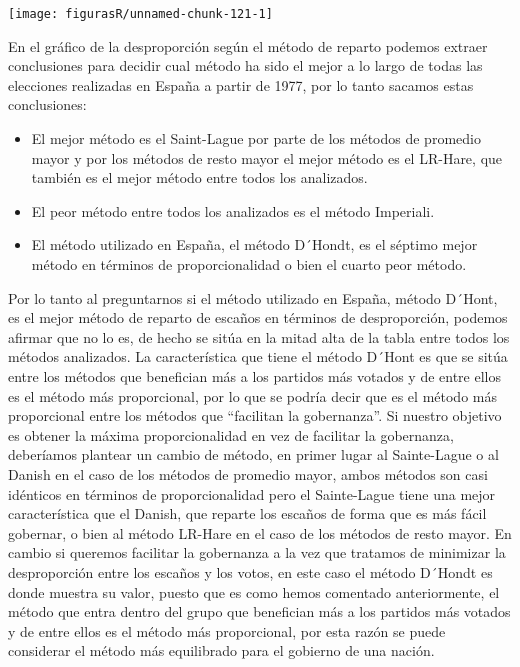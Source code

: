 \documentclass[12pt,a4paper,]{book}
\providecommand{\tightlist}{%
  \setlength{\itemsep}{0pt}\setlength{\parskip}{0pt}}
\numberwithin{dummy}{section}
\theoremstyle{ocrenumbox}
\theoremstyle{blacknumex}
\theoremstyle{blacknumbox}
\theoremstyle{ocrenum}
\theoremstyle{ocrenum}
\begin{document}
\begin{center}\texttt{[image: figurasR/unnamed-chunk-121-1]} \end{center}

En el gráfico de la desproporción según el método de reparto podemos
extraer conclusiones para decidir cual método ha sido el mejor a lo
largo de todas las elecciones realizadas en España a partir de 1977, por
lo tanto sacamos estas conclusiones:

\begin{itemize}
\tightlist
\item
  El mejor método es el Saint-Lague por parte de los métodos de promedio
  mayor y por los métodos de resto mayor el mejor método es el LR-Hare,
  que también es el mejor método entre todos los analizados.
\item
  El peor método entre todos los analizados es el método Imperiali.
\item
  El método utilizado en España, el método D´Hondt, es el séptimo mejor
  método en términos de proporcionalidad o bien el cuarto peor método.
\end{itemize}

Por lo tanto al preguntarnos si el método utilizado en España, método
D´Hont, es el mejor método de reparto de escaños en términos de
desproporción, podemos afirmar que no lo es, de hecho se sitúa en la
mitad alta de la tabla entre todos los métodos analizados. La
característica que tiene el método D´Hont es que se sitúa entre los
métodos que benefician más a los partidos más votados y de entre ellos
es el método más proporcional, por lo que se podría decir que es el
método más proporcional entre los métodos que ``facilitan la
gobernanza''. Si nuestro objetivo es obtener la máxima proporcionalidad
en vez de facilitar la gobernanza, deberíamos plantear un cambio de
método, en primer lugar al Sainte-Lague o al Danish en el caso de los
métodos de promedio mayor, ambos métodos son casi idénticos en términos
de proporcionalidad pero el Sainte-Lague tiene una mejor característica
que el Danish, que reparte los escaños de forma que es más fácil
gobernar, o bien al método LR-Hare en el caso de los métodos de resto
mayor. En cambio si queremos facilitar la gobernanza a la vez que
tratamos de minimizar la desproporción entre los escaños y los votos, en
este caso el método D´Hondt es donde muestra su valor, puesto que es
como hemos comentado anteriormente, el método que entra dentro del grupo
que benefician más a los partidos más votados y de entre ellos es el
método más proporcional, por esta razón se puede considerar el método
más equilibrado para el gobierno de una nación.
\end{document}
